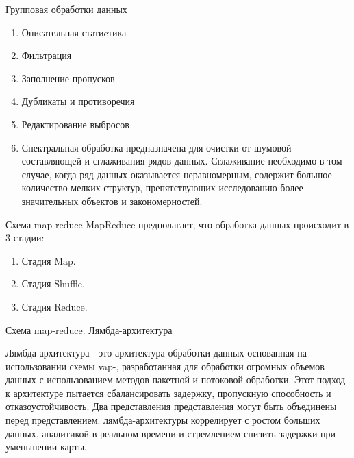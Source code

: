 \documentclass{beamer}
\begin{document}
\begin{frame}{Групповая обработки данных} 
\begin{enumerate}
\item Описательная статиcтика 
\item Фильтрация 
\item Заполнение пропусков
\item Дубликаты и противоречия
\item Редактирование выбросов 
\item Спектральная обработка предназначена для очистки от шумовой составляющей и сглаживания рядов данных. Сглаживание необходимо в том случае, когда ряд данных оказывается неравномерным, содержит большое количество мелких структур, препятствующих исследованию более значительных объектов и закономерностей. 


\end{enumerate}




\end{frame}




\begin{frame}{Схема map-reduce} 
MapReduce предполагает, что oбработка данных происходит в 3 стадии:
\begin{enumerate}

\item  Стадия Map.
\item   Стадия Shuffle.
\item   Стадия Reduce.
\end{enumerate}

\end{frame}

\begin{frame}{Схема map-reduce. Лямбда-архитектура  } 

Лямбда-архитектура - это архитектура обработки данных основанная на  использовании схемы vap-, разработанная для обработки огромных объемов данных с использованием методов пакетной и потоковой обработки.
 Этот подход к архитектуре пытается сбалансировать задержку, пропускную способность и отказоустойчивость. Два представления представления могут быть объединены перед представлением. лямбда-архитектуры коррелирует с ростом больших данных, аналитикой в реальном времени и стремлением снизить задержки при уменьшении карты.

\end{frame}
\end{document}
